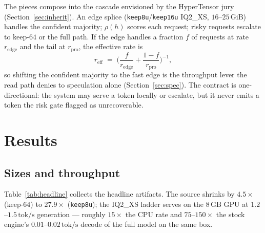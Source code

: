 \documentclass[11pt]{article}
\newcommand{\keepm}[1]{\texttt{keep#1}}
\newcommand{\gib}{\,\textrm{GiB}}
\newcommand{\gb}{\,\textrm{GB}}
\newcommand{\tps}{\,\textrm{tok/s}}
\begin{document}
The pieces compose into the cascade envisioned by the HyperTensor jury
(Section~\ref{sec:inherit}). An edge splice (\keepm{8u}/\keepm{16u} IQ2\_XS,
$16$--$25\gib{}$) handles the confident majority; $\rho(h)$ scores each request;
risky requests escalate to keep-$64$ or the full path. If the edge handles a
fraction $f$ of requests at rate $r_{\text{edge}}$ and the tail at
$r_{\text{pro}}$, the effective rate is
\begin{equation}
  r_{\text{eff}} \;=\; \Big(\frac{f}{r_{\text{edge}}} + \frac{1-f}{r_{\text{pro}}}\Big)^{-1},
  \label{eq:cascade}
\end{equation}
so shifting the confident majority to the fast edge is the throughput lever the
read path denies to speculation alone (Section~\ref{sec:spec}). The contract is
one-directional: the system may serve a token locally or escalate, but it never
emits a token the risk gate flagged as unrecoverable.

\section{Results}
\label{sec:results}

\subsection{Sizes and throughput}

Table~\ref{tab:headline} collects the headline artifacts. The source shrinks by
$4.5\times$ (keep-$64$) to $27.9\times$ (\keepm{8u}); the IQ2\_XS ladder serves on
the $8\gb{}$ GPU at $1.2$--$1.5\tps{}$ generation --- roughly $15\times$ the
CPU rate and $75$--$150\times$ the stock engine's $0.01$--$0.02\tps{}$ decode of
the full model on the same box.
\end{document}
